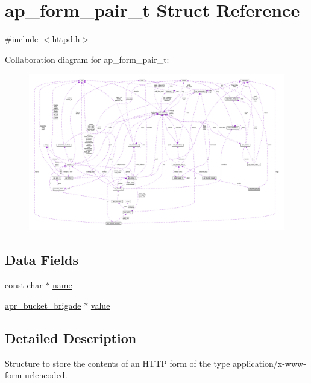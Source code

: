 \hypertarget{structap__form__pair__t}{}\section{ap\+\_\+form\+\_\+pair\+\_\+t Struct Reference}
\label{structap__form__pair__t}


{\ttfamily \#include $<$httpd.\+h$>$}



Collaboration diagram for ap\+\_\+form\+\_\+pair\+\_\+t\+:
\nopagebreak
\begin{figure}[H]
\begin{center}
\leavevmode
\includegraphics[width=350pt]{structap__form__pair__t__coll__graph}
\end{center}
\end{figure}
\subsection*{Data Fields}
\begin{DoxyCompactItemize}
\item 
const char $\ast$ \hyperlink{structap__form__pair__t_ab67919187770ae821be7816447629616}{name}
\item 
\hyperlink{structapr__bucket__brigade}{apr\+\_\+bucket\+\_\+brigade} $\ast$ \hyperlink{structap__form__pair__t_a9cb7fc0ef3940bd38ff78f6962bc5548}{value}
\end{DoxyCompactItemize}


\subsection{Detailed Description}
Structure to store the contents of an H\+T\+TP form of the type application/x-\/www-\/form-\/urlencoded.

